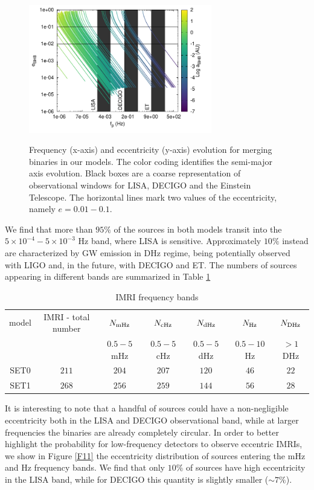 \documentclass[twocolumn]{aastex62}
\begin{document}
\begin{figure}
\centering
\includegraphics[width=8cm]{freq_evo}\\
\caption{Frequency (x-axis) and eccentricity (y-axis) evolution for merging binaries in our models. The color coding identifies the semi-major axis evolution. Black boxes are a coarse representation of observational windows for LISA, DECIGO and the Einstein Telescope. The horizontal lines mark two values of the eccentricity, namely $e=0.01-0.1$.}
\label{F10}
\end{figure}

We find that more than $95\%$ of the sources in both models transit into the $5\times 10^{-4} - 5\times 10^{-3}$ Hz band, where LISA is sensitive. Approximately $10\%$ instead are characterized by GW emission in DHz regime, being potentially observed with LIGO and, in the future, with DECIGO and ET.
The numbers of sources appearing in different bands are summarized in Table \ref{tab:t4}
 
 \begin{table}
     \centering
     \caption{IMRI frequency bands}
     \begin{tabular}{ccccccc}
        \hline
        \hline
        model & IMRI - total number & $N_{\rm mHz}$ & $N_{\rm cHz}$ & $N_{\rm dHz}$ & $N_{\rm Hz}$ & $N_{\rm DHz}$ \\ 
              &                     &$0.5-5$ mHz    & $ 0.5-5$ cHz  &  $0.5-5$ dHz & $0.5-10$ Hz & $>1$ DHz \\
        \hline
        SET0 & $211$ & $204$ &  $207$ & $120$ & $46$ & $22$   \\
        SET1 & $268$ & $256$ &  $259$ & $144$ & $56$ & $28$   \\
        \hline
     \end{tabular}
     \label{tab:t4}
 \end{table}
 
 
It is interesting to note that a handful of sources could have a non-negligible eccentricity both in the LISA and DECIGO observational band, while at larger frequencies the binaries are already completely circular. In order to better highlight the probability for low-frequency detectors to observe eccentric IMRIs, we show in Figure \ref{F11} the eccentricity distribution of sources entering the mHz and Hz frequency bands. We find that only $10\%$ of sources have high eccentricity in the LISA band, while for DECIGO this quantity is slightly smaller ($\sim 7\%$).
 
\end{document}

